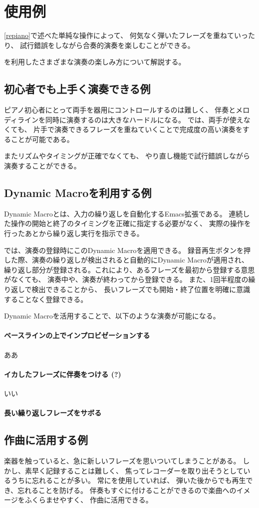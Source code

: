\section{{\system}使用例}

\ref{repiano}で述べた単純な操作によって、
何気なく弾いたフレーズを重ねていったり、
試行錯誤をしながら合奏的演奏を楽しむことができる。

{\system}を利用したさまざまな演奏の楽しみ方について解説する。

\subsection{初心者でも上手く演奏できる例}
ピアノ初心者にとって両手を器用にコントロールするのは難しく、
伴奏とメロディラインを同時に演奏するのは大きなハードルになる。
{\system}では、両手が使えなくても、
片手で演奏できるフレーズを重ねていくことで完成度の高い演奏をすることが可能である。

またリズムやタイミングが正確でなくても、
やり直し機能で試行錯誤しながら演奏することができる。


\subsection{Dynamic Macroを利用する例}
Dynamic Macroとは、入力の繰り返しを自動化するEmacs拡張である。
連続した操作の開始と終了のタイミングを正確に指定する必要がなく、
実際の操作を行ったあとから繰り返し実行を指示できる。

{\system}では、演奏の登録時にこのDynamic Macroを適用できる。
録音再生ボタンを押した際、演奏の繰り返しが検出されると自動的にDynamic Macroが適用され、
繰り返し部分が登録される。これにより、あるフレーズを最初から登録する意思がなくても、
演奏中や、演奏が終わってから登録できる。
また、1回半程度の繰り返しで検出できることから、
長いフレーズでも開始・終了位置を明確に意識することなく登録できる。

Dynamic Macroを活用することで、以下のような演奏が可能になる。

\paragraph*{ベースラインの上でインプロビゼーションする}
ああ
\paragraph*{イカしたフレーズに伴奏をつける (?)}
いい
\paragraph*{長い繰り返しフレーズをサボる}



\subsection{作曲に活用する例}
楽器を触っていると、急に新しいフレーズを思いついてしまうことがある。
しかし、素早く記録することは難しく、
焦ってレコーダーを取り出そうとしているうちに忘れることが多い。
常に{\system}を使用していれば、
弾いた後からでも再生でき、忘れることを防げる。
伴奏もすぐに付けることができるので楽曲へのイメージをふくらませやすく、
作曲に活用できる。
